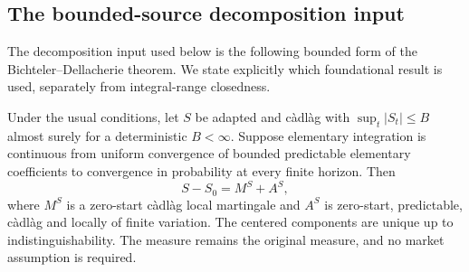 \subsection{The bounded-source decomposition input}
\label{sec:bounded-source}
The decomposition input used below is the following bounded form of the
Bichteler--Dellacherie theorem. We state explicitly which foundational result
is used, separately from integral-range closedness.

\begin{theorem}
\label{thm:bounded-source}
Under the usual conditions, let $S$ be adapted and c\`adl\`ag with
$\sup_t|S_t|\leq B$ almost surely for a deterministic $B<\infty$.
Suppose elementary integration is continuous from uniform convergence of
bounded predictable elementary coefficients to convergence in probability
at every finite horizon. Then
\[
 S-S_0=M^S+A^S,
\]
where $M^S$ is a zero-start c\`adl\`ag local martingale and $A^S$ is zero-start,
predictable, c\`adl\`ag and locally of finite variation. The centered
components are unique up to indistinguishability. The measure remains the
original measure, and no market assumption is required.
\end{theorem}
